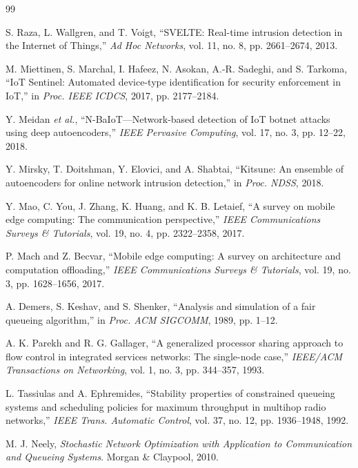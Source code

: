 \documentclass[10pt,journal]{IEEEtran}
\begin{document}
\begin{thebibliography}{99}

S. Raza, L. Wallgren, and T. Voigt,
``SVELTE: Real-time intrusion detection in the Internet of Things,''
\emph{Ad Hoc Networks}, vol. 11, no. 8, pp. 2661--2674, 2013.

M. Miettinen, S. Marchal, I. Hafeez, N. Asokan, A.-R. Sadeghi,
and S. Tarkoma,
``IoT Sentinel: Automated device-type identification for security
enforcement in IoT,''
in \emph{Proc. IEEE ICDCS}, 2017, pp. 2177--2184.

Y. Meidan \emph{et al.},
``N-BaIoT---Network-based detection of IoT botnet attacks using deep
autoencoders,''
\emph{IEEE Pervasive Computing}, vol. 17, no. 3, pp. 12--22, 2018.

Y. Mirsky, T. Doitshman, Y. Elovici, and A. Shabtai,
``Kitsune: An ensemble of autoencoders for online network intrusion
detection,''
in \emph{Proc. NDSS}, 2018.

Y. Mao, C. You, J. Zhang, K. Huang, and K. B. Letaief,
``A survey on mobile edge computing: The communication perspective,''
\emph{IEEE Communications Surveys \& Tutorials},
vol. 19, no. 4, pp. 2322--2358, 2017.

P. Mach and Z. Becvar,
``Mobile edge computing: A survey on architecture and computation
offloading,''
\emph{IEEE Communications Surveys \& Tutorials},
vol. 19, no. 3, pp. 1628--1656, 2017.

A. Demers, S. Keshav, and S. Shenker,
``Analysis and simulation of a fair queueing algorithm,''
in \emph{Proc. ACM SIGCOMM}, 1989, pp. 1--12.

A. K. Parekh and R. G. Gallager,
``A generalized processor sharing approach to flow control in integrated
services networks: The single-node case,''
\emph{IEEE/ACM Transactions on Networking},
vol. 1, no. 3, pp. 344--357, 1993.

L. Tassiulas and A. Ephremides,
``Stability properties of constrained queueing systems and scheduling
policies for maximum throughput in multihop radio networks,''
\emph{IEEE Trans. Automatic Control},
vol. 37, no. 12, pp. 1936--1948, 1992.

M. J. Neely,
\emph{Stochastic Network Optimization with Application to Communication
and Queueing Systems}.
Morgan \& Claypool, 2010.


\end{thebibliography}
\end{document}
